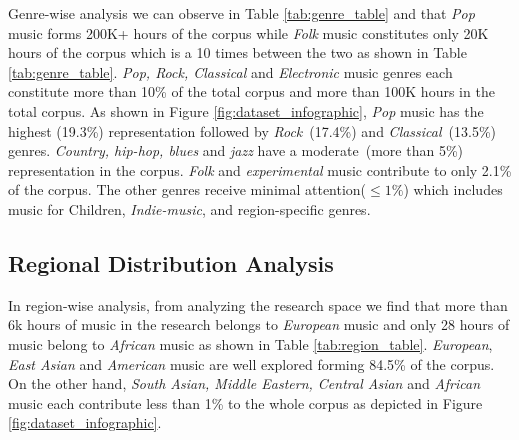 Genre-wise analysis we can observe in Table \ref{tab:genre_table} and that \textit{Pop} music forms 200K+ hours of the corpus while \textit{Folk} music constitutes only 20K hours of the corpus which is a 10 times between the two as shown in Table \ref{tab:genre_table}. \textit{Pop, Rock, Classical} and \textit{Electronic} music genres each constitute more than 10\% of the total corpus and more than 100K hours in the total corpus. As shown in Figure \ref{fig:dataset_infographic}, \textit{Pop} music has the highest (19.3\%) representation followed by \textit{Rock}~(17.4\%) and \textit{Classical}~(13.5\%) genres. \textit{Country, hip-hop}\textit{, blues }and \textit{jazz} have a moderate~(more than 5\%) representation in the corpus. \textit{Folk} and \textit{experimental} music contribute to only 2.1\% of the corpus. The other genres receive minimal attention(\textbf{$\leq 1\%$}) which includes music for Children, \textit{Indie-music}, and region-specific genres.
 
\subsection{Regional Distribution Analysis}
In region-wise analysis, from analyzing the research space we find that more than 6k hours of music in the research belongs to \textit{European} music and only 28 hours of music belong to \textit{African} music as shown in Table \ref{tab:region_table}. \textit{European}, \textit{East Asian} and\textit{ American} music are well explored forming 84.5\% of the corpus. On the other hand, \textit{South Asian, Middle Eastern, Central Asian} and \textit{African} music each contribute less than 1\% to the whole corpus as depicted in Figure \ref{fig:dataset_infographic}.

\begin{table}[htbp]
\centering
{}
\caption{Distribution of Hours and Papers by Genre. Duration (Dur.) is represented as 10\textsuperscript{3} hours.}
\label{tab:genre_table}
\end{table}

